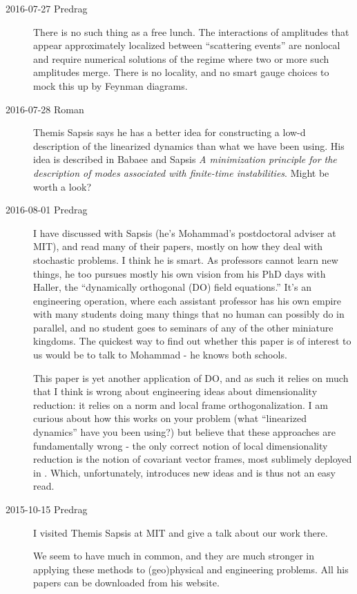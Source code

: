 \begin{description}
\item[2016-07-27 Predrag]
There is no such thing as a free lunch. The interactions of amplitudes
that appear approximately localized between ``scattering events'' are
nonlocal and require numerical solutions of the regime where two or
more such amplitudes merge. There is no locality, and no smart gauge choices to
mock this up by Feynman diagrams.

\item[2016-07-28 Roman]
Themis Sapsis says he has a better idea for constructing a low-d
description of the linearized dynamics than what we have been using.
His idea is described in Babaee and Sapsis {\em A minimization
principle for the description of modes associated with finite-time
instabilities}. Might be worth a look?

\item[2016-08-01 Predrag]
I have discussed with Sapsis (he's Mohammad's postdoctoral adviser at
MIT), and read many of their papers, mostly on how they deal with
stochastic problems. I think he is smart. As professors cannot learn new
things, he too pursues mostly his own vision from his PhD days with
Haller, the ``dynamically orthogonal (DO) field equations.'' It's an
engineering operation, where each assistant professor has his own empire
with many students doing many things that no human can possibly do in
parallel, and no student goes to seminars of any of the other miniature
kingdoms. The quickest way to find out whether this paper is of interest
to us would be to talk to Mohammad - he knows both schools.

This paper is yet another application of DO, and as such it relies on
much that I think is wrong about engineering ideas about dimensionality
reduction: it relies on a norm and local frame orthogonalization. I am
curious about how this works on your problem (what ``linearized
dynamics'' have you been using?) but believe that these approaches are
fundamentally wrong - the only correct notion of local dimensionality
reduction is the notion of covariant vector frames, most sublimely
deployed in . Which, unfortunately, introduces new
ideas and is thus not an easy read.

\item[2015-10-15 Predrag]
I visited  {Themis Sapsis} at
MIT and give a talk about our work there.

We seem to have much in common, and they are much stronger in applying
these methods to (geo)physical and engineering problems. All his papers
can be downloaded from his website.


\end{description}
